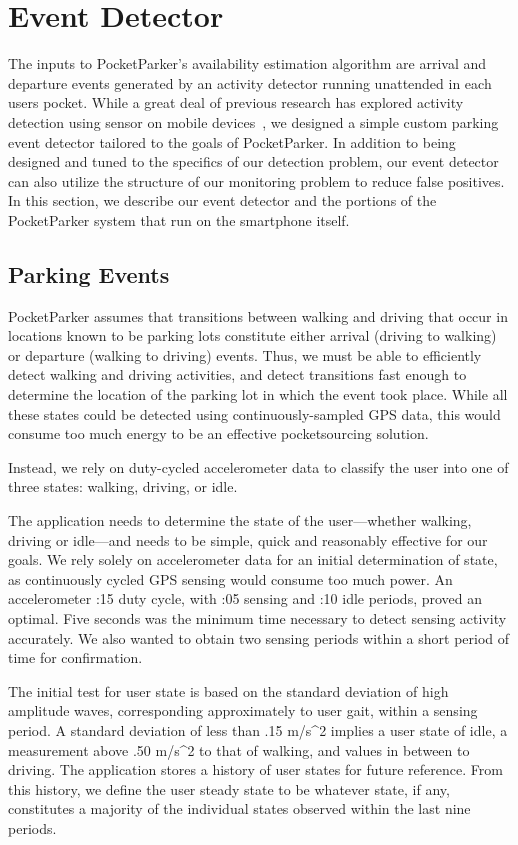 \section{Event Detector}
\label{sec-detector}

The inputs to PocketParker's availability estimation algorithm are arrival
and departure events generated by an activity detector running unattended in
each users pocket. While a great deal of previous research has explored
activity detection using sensor on mobile devices~\cite{FIXME}, we designed a
simple custom parking event detector tailored to the goals of PocketParker.
In addition to being designed and tuned to the specifics of our detection
problem, our event detector can also utilize the structure of our monitoring
problem to reduce false positives. In this section, we describe our event
detector and the portions of the PocketParker system that run on the
smartphone itself.

\subsection{Parking Events}
\label{subsec-goals}

PocketParker assumes that transitions between walking and driving that occur
in locations known to be parking lots constitute either arrival (driving to
walking) or departure (walking to driving) events. Thus, we must be able to
efficiently detect walking and driving activities, and detect transitions
fast enough to determine the location of the parking lot in which the event
took place. While all these states could be detected using
continuously-sampled GPS data, this would consume too much energy to be an
effective pocketsourcing solution.

Instead, we rely on duty-cycled accelerometer data to classify the user into
one of three states: walking, driving, or idle.

The application needs to determine the state of the user---whether walking,
driving or idle---and needs to be simple, quick and reasonably effective
for our goals. We rely solely on accelerometer data for an initial
determination of state, as continuously cycled GPS sensing would consume too
much power. An accelerometer :15 duty cycle, with :05 sensing and :10 idle
periods, proved an optimal. Five seconds was the minimum time necessary to
detect sensing activity accurately. We also wanted to obtain two sensing
periods within a short period of time for confirmation.

The initial test for user state is based on the standard deviation of high
amplitude waves, corresponding approximately to user gait, within a sensing
period. A standard deviation of less than .15 m/s^2 implies a user state of
idle, a measurement above .50 m/s^2 to that of walking, and values in between
to driving. The application stores a history of user states for future
reference. From this history, we define the user steady state to be whatever
state, if any, constitutes a majority of the individual states observed
within the last nine periods.

